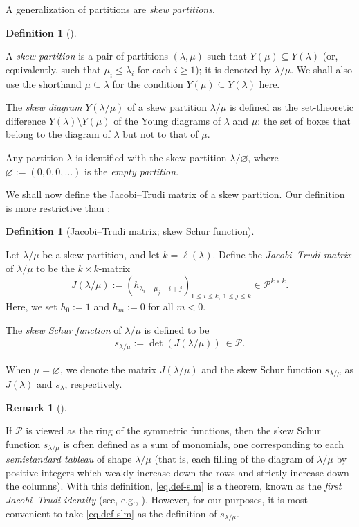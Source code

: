 \documentclass[numbers=enddot,12pt,final,onecolumn,notitlepage]{scrartcl}%
\theoremstyle{definition}
\newtheorem{defi}[theo]{Definition}
\newenvironment{definition}[1][]
{\begin{defi}[#1]\begin{leftbar}}
{\end{leftbar}\end{defi}}
\newtheorem{remk}[theo]{Remark}
\newenvironment{remark}[1][]
{\begin{remk}[#1]\begin{leftbar}}
{\end{leftbar}\end{remk}}
\newcommand{\tup}[1]{\left( #1 \right)}
\renewcommand{\leq}{\leqslant}
\renewcommand{\geq}{\geqslant}
\theoremstyle{plainsl}
\begin{document}
A generalization of partitions are \emph{skew partitions}.

\begin{definition}
A \emph{skew partition} is a pair of partitions $(\lambda, \mu)$ such that $Y\tup{\mu} \subseteq Y\tup{\lambda}$ (or, equivalently, such that $\mu_i \leq \lambda_i$ for each $i \geq 1$); it is denoted by $\lambda / \mu$.
We shall also use the shorthand $\mu \subseteq \lambda$ for the condition $Y\tup{\mu} \subseteq Y\tup{\lambda}$ here.

The \emph{skew diagram} $Y\tup{\lambda / \mu}$ of a skew partition $\lambda / \mu$ is defined as the set-theoretic difference $Y\tup{\lambda} \setminus Y\tup{\mu}$ of the Young diagrams of $\lambda$ and $\mu$: the set of boxes that belong to the diagram of $\lambda$ but not to that of $\mu$.

Any partition $\lambda$ is identified with the skew partition $\lambda / \varnothing$, where $\varnothing := \tup{0,0,0,\ldots}$ is the \emph{empty partition}.
\end{definition}

We shall now define the Jacobi--Trudi matrix of a skew partition. Our definition is more restrictive than \cite[Definition 2.3]{Anzis18}:

\begin{definition}[Jacobi--Trudi matrix; skew Schur function]
\label{Jacobi--Trudi Identity}
Let $\lambda / \mu$ be a skew partition, and let $k = \ell\tup{\lambda}$.
Define the \emph{Jacobi--Trudi matrix} of $\lambda/\mu$ to be the $k \times k$-matrix
\[
J(\lambda/\mu) := \tup{ h_{\lambda_i-\mu_j - i + j} }_{1\leq i\leq k,\ 1\leq j\leq k}
\in \mathcal{P}^{k\times k} .
\]
Here, we set $h_0 := 1$ and $h_m := 0$ for all $m < 0$.

The \emph{skew Schur function} of $\lambda/\mu$ is defined to be
\begin{align}
   s_{\lambda/\mu} := \det \tup{ J(\lambda/\mu) } \  \in \mathcal{P} .
\label{eq.def-slm}
\end{align}

When $\mu = \varnothing$, we denote the matrix $J(\lambda/\mu)$ and the skew Schur function $s_{\lambda/\mu}$ as $J(\lambda)$ and $s_\lambda$, respectively.
\end{definition}


\begin{remark}
\label{flushremark}
If $\mathcal{P}$ is viewed as the ring of the symmetric functions, then the skew Schur function $s_{\lambda/\mu}$ is often defined as a sum of monomials, one corresponding to each \emph{semistandard tableau} of shape $\lambda / \mu$ (that is, each filling of the diagram of $\lambda/\mu$ by positive integers which weakly increase down the rows and strictly increase down the columns). With this definition, \eqref{eq.def-slm} is a theorem, known as the \emph{first Jacobi--Trudi identity} (see, e.g., \cite[Theorem 7.16.1]{EC2}).
However, for our purposes, it is most convenient to take \eqref{eq.def-slm} as the definition of $s_{\lambda/\mu}$.
\end{remark}
\end{document}
